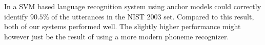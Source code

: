 In \cite{noor2006efficient} a SVM based language recognition system using anchor models could correctly identify $90.5$\% of the utterances in the NIST 2003 set. Compared to this result, both of our systems performed well. The slightly higher performance might however just be the result of using a more modern phoneme recognizer. 